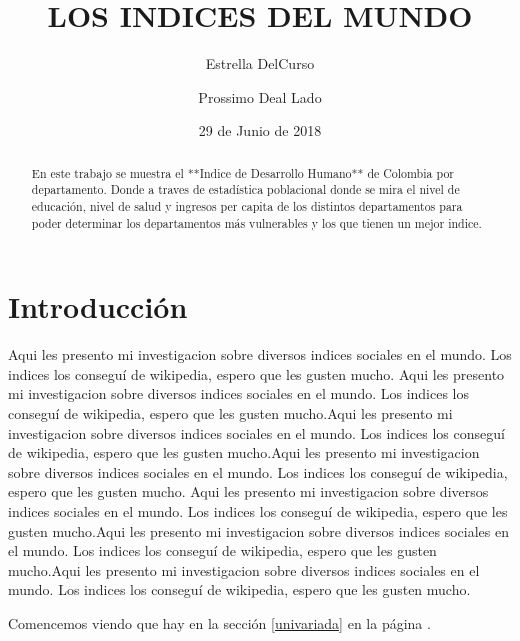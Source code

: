 \documentclass{article}
\title{LOS INDICES DEL MUNDO}
\author[1]{\normalsize Estrella DelCurso}
\author[2]{\normalsize Prossimo Deal Lado}
\affil[1,2]{\small  Escuela de Ingeniería,Universidad de los Andes\\
\texttt{{delcurso,deallado}@uniandes.edu.col}}
\affil[1]{\small Instituto de altas investigaciones financieras\\
Banco del Parque\\
\texttt{delcurso@bp.com.col}}
\date{29 de Junio de 2018}
\begin{document}


\maketitle


\begin{abstract}
En este trabajo se muestra el **Indice de Desarrollo Humano** de Colombia por departamento. Donde a traves de estadística poblacional donde se mira el nivel de educación, nivel de salud y ingresos per capita de los distintos departamentos para poder determinar los departamentos más vulnerables y los que tienen un mejor indice. 
\end{abstract}

\section*{Introducción}

Aqui les presento mi investigacion sobre diversos indices sociales en el mundo. Los indices los conseguí de wikipedia, espero que les gusten mucho. Aqui les presento mi investigacion sobre diversos indices sociales en el mundo. Los indices los conseguí de wikipedia, espero que les gusten mucho.Aqui les presento mi investigacion sobre diversos indices sociales en el mundo. Los indices los conseguí de wikipedia, espero que les gusten mucho.Aqui les presento mi investigacion sobre diversos indices sociales en el mundo. Los indices los conseguí de wikipedia, espero que les gusten mucho.
Aqui les presento mi investigacion sobre diversos indices sociales en el mundo. Los indices los conseguí de wikipedia, espero que les gusten mucho.Aqui les presento mi investigacion sobre diversos indices sociales en el mundo. Los indices los conseguí de wikipedia, espero que les gusten mucho.Aqui les presento mi investigacion sobre diversos indices sociales en el mundo. Los indices los conseguí de wikipedia, espero que les gusten mucho.




Comencemos viendo que hay en la sección \ref{univariada} en la página \pageref{univariada}.

\clearpage



%
%


%
%
\end{document}
